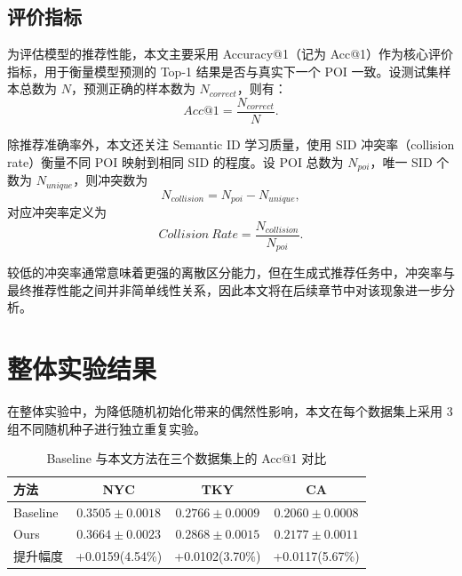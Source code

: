 \subsection{评价指标}

为评估模型的推荐性能，本文主要采用 Accuracy@1（记为 Acc@1）作为核心评价指标，用于衡量模型预测的 Top-1 结果是否与真实下一个 POI 一致。设测试集样本总数为 $N$，预测正确的样本数为 $N_{correct}$，则有：
\begin{equation}
Acc@1 = \frac{N_{correct}}{N}.
\end{equation}

除推荐准确率外，本文还关注 Semantic ID 学习质量，使用 SID 冲突率（collision rate）衡量不同 POI 映射到相同 SID 的程度。设 POI 总数为 $N_{poi}$，唯一 SID 个数为 $N_{unique}$，则冲突数为
\begin{equation}
N_{collision}=N_{poi}-N_{unique},
\end{equation}
对应冲突率定义为
\begin{equation}
Collision\ Rate = \frac{N_{collision}}{N_{poi}}.
\end{equation}

较低的冲突率通常意味着更强的离散区分能力，但在生成式推荐任务中，冲突率与最终推荐性能之间并非简单线性关系，因此本文将在后续章节中对该现象进一步分析。

\section{整体实验结果}
\label{sec:main_result}

在整体实验中，为降低随机初始化带来的偶然性影响，本文在每个数据集上采用 3 组不同随机种子进行独立重复实验。

\begin{table}[htbp]
\centering
\caption{Baseline 与本文方法在三个数据集上的 Acc@1 对比}
\label{tab:main_acc1}
\begin{tabular}{lccc}
\toprule
方法 & NYC & TKY & CA \\
\midrule
Baseline & $0.3505 \pm 0.0018$ & $0.2766 \pm 0.0009$ & $0.2060 \pm 0.0008$ \\
Ours & $\mathbf{0.3664 \pm 0.0023}$ & $\mathbf{0.2868 \pm 0.0015}$ & $\mathbf{0.2177 \pm 0.0011}$ \\
提升幅度 & +0.0159(4.54\%) & +0.0102(3.70\%) & +0.0117(5.67\%) \\
\bottomrule
\end{tabular}
\end{table}

